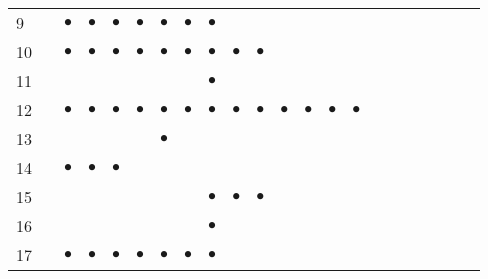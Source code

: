 \documentclass[text.tex]{subfiles}
\begin{document}
\begin{table}
\begin{tabular}{l|ccccccccccccccccccccc}
9   &           & $\bullet$ & $\bullet$ & $\bullet$ & $\bullet$ & $\bullet$ & $\bullet$ & $\bullet$ &           &           &           &           &           &           &           &           &           &           &           &           &           \\
10  &           & $\bullet$ & $\bullet$ & $\bullet$ & $\bullet$ & $\bullet$ & $\bullet$ & $\bullet$ & $\bullet$ & $\bullet$ &           &           &           &           &           &           &           &           &           &           &           \\
11  &           &           &           &           &           &           &           & $\bullet$ &           &           &           &           &           &           &           &           &           &           &           &           &           \\
12  &           & $\bullet$ & $\bullet$ & $\bullet$ & $\bullet$ & $\bullet$ & $\bullet$ & $\bullet$ & $\bullet$ & $\bullet$ & $\bullet$ & $\bullet$ & $\bullet$ & $\bullet$ &           &           &           &           &           &           &           \\
13  &           &           &           &           &           & $\bullet$ &           &           &           &           &           &           &           &           &           &           &           &           &           &           &           \\
14  &           & $\bullet$ & $\bullet$ & $\bullet$ &           &           &           &           &           &           &           &           &           &           &           &           &           &           &           &           &           \\
15  &           &           &           &           &           &           &           & $\bullet$ & $\bullet$ & $\bullet$ &           &           &           &           &           &           &           &           &           &           &           \\
16  &           &           &           &           &           &           &           & $\bullet$ &           &           &           &           &           &           &           &           &           &           &           &           &           \\
17  &           & $\bullet$ & $\bullet$ & $\bullet$ & $\bullet$ & $\bullet$ & $\bullet$ & $\bullet$ &           &           &           &           &           &           &           &           &           &           &           &           &           \\

\end{tabular}
\end{table}
\end{document}
